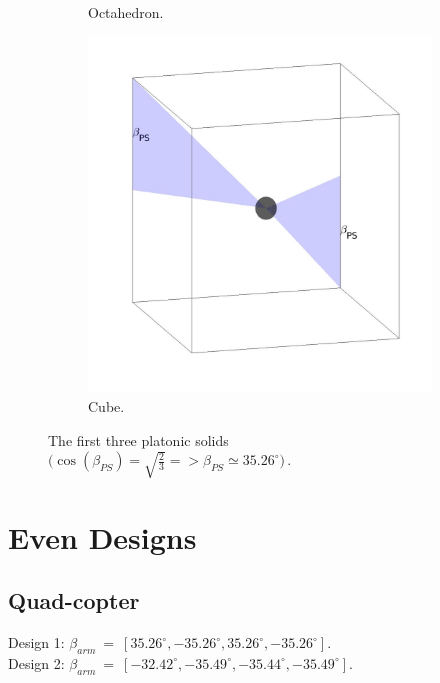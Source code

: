 \begin{figure}[!h]
\begin{subfigure}[b]{0.27\textwidth}
    \caption{Octahedron.} \label{fig:octahedron}
  \end{subfigure}
  \hspace*{\fill} %
  \begin{subfigure}[b]{0.26\textwidth}
    \includegraphics[width=\linewidth]{images/cube.jpg}
    \caption{Cube.} \label{fig:cube}
  \end{subfigure}
  \caption{The first three platonic solids $\big(\cos(\beta_{PS}) = \sqrt{\frac{2}{3}}
  =>  \beta_{PS} \simeq 35.26^{\circ}\big)\, .$}
  \label{fig:platonic_solid}
\end{figure}



\section{Even Designs}
\label{sec:even_designs}

\subsection{Quad-copter}
\label{sec:quad_copter}
Design 1: $\beta_{arm}\ =\ [35.26^{\circ}, -35.26^{\circ}, 35.26^{\circ}, -35.26^{\circ}]$.\\
Design 2: $\beta_{arm}\ =\ [-32.42^{\circ}, -35.49^{\circ}, -35.44^{\circ}, -35.49^{\circ}]$.

